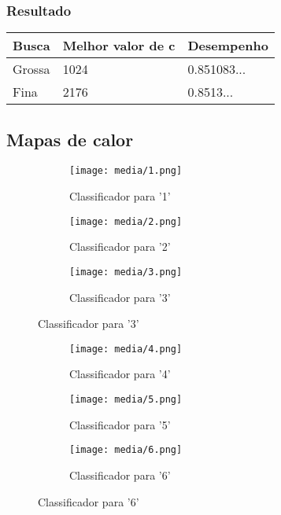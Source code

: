 \documentclass[a4paper]{article}
\begin{document}
\subsubsection{Resultado}

\begin{table}[H]
    \centering
    \begin{tabular}{|l|l|l|}
        \hline
        \textbf{Busca} & \textbf{Melhor valor de c} & \textbf{Desempenho} \\ \hline
        Grossa         & 1024                       & 0.851083...         \\ \hline
        Fina           & 2176                       & 0.8513...           \\ \hline
    \end{tabular}
\end{table}

\subsection{Mapas de calor}

\begin{figure}[H]
    \centering
    \begin{subfigure}{.33\textwidth}
        \centerline{\texttt{[image: media/1.png]}}
        \caption{Classificador para '1'}
        \label{fig:fig3}
    \end{subfigure}%
    \begin{subfigure}{.33\textwidth}
        \centerline{\texttt{[image: media/2.png]}}
        \caption{Classificador para '2'}
        \label{fig:fig4}
    \end{subfigure}%
    \begin{subfigure}{.33\textwidth}
        \centerline{\texttt{[image: media/3.png]}}
        \caption{Classificador para '3'}
        \label{fig:fig5}
    \end{subfigure}
\end{figure}

\begin{figure}[H]
    \centering
    \begin{subfigure}{.33\textwidth}
        \centerline{\texttt{[image: media/4.png]}}
        \caption{Classificador para '4'}
        \label{fig:fig6}
    \end{subfigure}%
    \begin{subfigure}{.33\textwidth}
        \centerline{\texttt{[image: media/5.png]}}
        \caption{Classificador para '5'}
        \label{fig:fig7}
    \end{subfigure}%
    \begin{subfigure}{.33\textwidth}
        \centerline{\texttt{[image: media/6.png]}}
        \caption{Classificador para '6'}
        \label{fig:fig8}
    \end{subfigure}
\end{figure}
\end{document}
